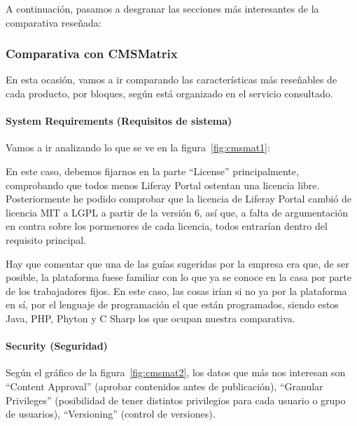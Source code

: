 \par A continuación, pasamos a desgranar las secciones más interesantes de la comparativa reseñada:

\subsubsection{Comparativa con CMSMatrix}

\par En esta ocasión, vamos a ir comparando las características más reseñables de cada producto, por bloques, según está organizado en el servicio consultado.

\paragraph{System Requirements (Requisitos de sistema)}

\par Vamos a ir analizando lo que se ve en la figura~\ref{fig:cmsmat1}:


\par En este caso, debemos fijarnos en la parte ``License'' principalmente, comprobando que todos menos Liferay Portal ostentan una licencia libre. Posteriormente he podido comprobar que la licencia de Liferay Portal cambió de licencia MIT a LGPL a partir de la versión 6\cite{references:liferaylicense}, así que, a falta de argumentación en contra sobre los pormenores de cada licencia, todos entrarían dentro del requisito principal.

\par Hay que comentar que una de las guías sugeridas por la empresa era que, de ser posible, la plataforma fuese familiar con lo que ya se conoce en la casa por parte de los trabajadores fijos. En este caso, las cosas irían si no ya por la plataforma en sí, por el lenguaje de programación el que están programados, siendo estos Java, PHP, Phyton y C Sharp los que ocupan nuestra comparativa.

\paragraph{Security (Seguridad)}

\par Según el gráfico de la figura~\ref{fig:cmsmat2}, los datos que más nos interesan son ``Content Approval'' (aprobar contenidos antes de publicación), ``Granular Privileges'' (posibilidad de tener distintos privilegios para cada usuario o grupo de usuarios), ``Versioning'' (control de versiones).

